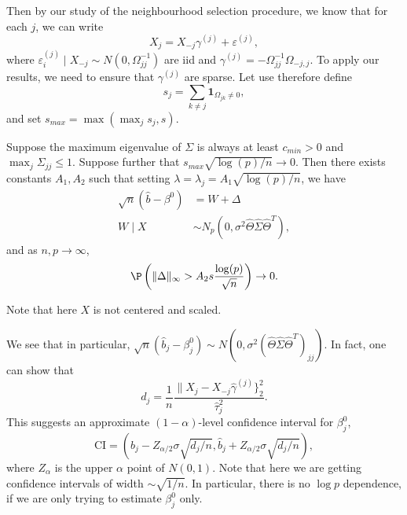 \documentclass[a4paper]{article}
\begin{document}
Then by our study of the neighbourhood selection procedure, we know that for each $j$, we can write
\[
  X_j = X_{-j} \gamma^{(j)} + \varepsilon^{(j)},
\]
where $\varepsilon_i^{(j)}\mid X_{-j} \sim N(0, \Omega_{jj}^{-1})$ are iid and $\gamma^{(j)} = - \Omega_{jj}^{-1} \Omega_{-j, j}$. To apply our results, we need to ensure that $\gamma^{(j)}$ are sparse. Let use therefore define
\[
  s_j = \sum_{k \not= j} \mathbf{1}_{\Omega_{jk} \not =0},
\]
and set $s_{max} = \max (\max_j s_j, s)$.

\begin{thm}
  Suppose the maximum eigenvalue of $\Sigma$ is always at least $c_{min} > 0$ and $\max_j \Sigma_{jj} \leq 1$. Suppose further that $s_{max} \sqrt{\log (p)/n} \to 0$. Then there exists constants $A_1, A_2$ such that setting $\lambda = \lambda_j = A_1 \sqrt{\log(p) /n}$, we have
  \begin{align*}
    \sqrt{n} (\hat{b} - \beta^0) &= W + \Delta\\
    W\mid X &\sim N_p(0, \sigma^2 \hat{\Theta} \hat{\Sigma} \hat{\Theta}^T),
  \end{align*}
  and as $n, p \to \infty$,
  \[
    \P\left(\|\Delta\|_\infty > A_2 s \frac{\log(p)}{\sqrt{n}}\right) \to 0.
  \]
\end{thm}
Note that here $X$ is not centered and scaled.

We see that in particular, $\sqrt{n}(\hat{b}_j - \beta_j^0) \sim N(0, \sigma^2(\hat{\Theta} \hat{\Sigma} \hat{\Theta}^T)_{jj})$. In fact, one can show that
\[
  d_j = \frac{1}{n} \frac{\|X_j - X_{-j} \hat{\gamma}^{(j)}\}_2^2}{\hat{\tau}_j^2}.
\]
This suggests an approximate $(1 - \alpha)$-level confidence interval for $\beta^0_j$,
\[
  \mathrm{CI} = \left(b_j - Z_{\alpha/2} \sigma \sqrt{d_j/n}, \hat{b}_j + Z_{\alpha/2} \sigma \sqrt{d_j/n}\right),
\]
where $Z_\alpha$ is the upper $\alpha$ point of $N(0, 1)$. Note that here we are getting confidence intervals of width $\sim \sqrt{1/n}$. In particular, there is no $\log p$ dependence, if we are only trying to estimate $\beta^0_j$ only.
\end{document}
